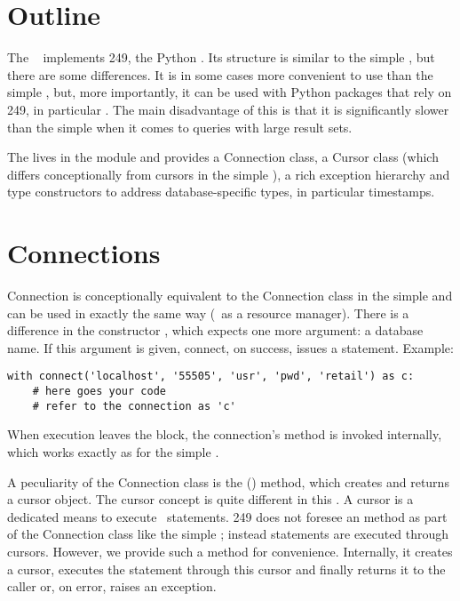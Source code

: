 \section{Outline}
The \nowdb\  implements
 249, the Python .
Its structure is similar to the simple ,
but there are some differences.
It is in some cases more convenient to use
than the simple , but, more importantly,
it can be used with Python packages that rely on
 249, in particular .
The main disadvantage of this  is
that it is significantly slower
than the simple 
when it comes to queries with large result sets.

The  lives in the module 
and provides a Connection class,
a Cursor class (which differs conceptionally
from cursors in the simple ),
a rich exception hierarchy and type constructors
to address database-specific types,
in particular timestamps.

\section{Connections}
Connection is conceptionally equivalent
to the Connection class in the simple 
and can be used in exactly the same way (\eg\
as a resource manager).
There is a difference in the constructor
, which expects one more argument:
a database name. If this argument is given,
connect, on success, issues a  statement.
Example:

\begin{python}
\begin{lstlisting}
with connect('localhost', '55505', 'usr', 'pwd', 'retail') as c:
    # here goes your code
    # refer to the connection as 'c'
\end{lstlisting}
\end{python}

When execution leaves the  block,
the connection's  method is invoked internally,
which works exactly as for the simple .

A peculiarity of the Connection class is the () method,
which creates and returns a cursor object.
The cursor concept is quite different in this .
A cursor is a dedicated means to execute \sql\ statements.
 249 does not foresee
an  method as part of the Connection class
like the simple ;
instead statements are executed through cursors.
However, we provide such a method for convenience.
Internally, it creates a cursor, executes the statement
through this cursor and finally returns it to the caller
or, on error, raises an exception.

